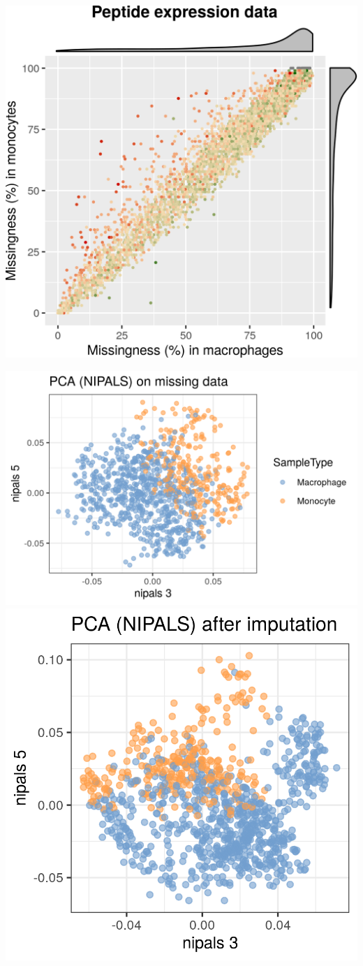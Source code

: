 \documentclass{article}
\begin{document}
\begin{multicols}{2}
\begin{minipage}[t]{\linewidth}
  \includegraphics[width=0.5\linewidth]{figs/missing.png}
  
  \includegraphics[width=0.61\linewidth]{figs/PCA_missing.png}
  \includegraphics[width=0.39\linewidth]{figs/PCA_imputed.png}
  
\end{minipage}

\noindent
\begin{minipage}[t]{\linewidth}

\end{minipage}
\end{multicols}
\end{document}
